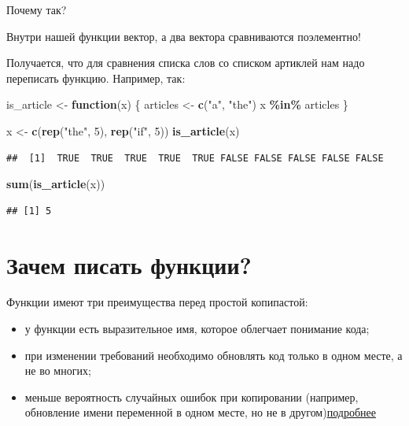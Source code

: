 \documentclass[
]{book}
\newenvironment{Shaded}{\begin{snugshade}}{\end{snugshade}}
\newcommand{\ControlFlowTok}[1]{\textcolor[rgb]{0.13,0.29,0.53}{\textbf{#1}}}
\newcommand{\DecValTok}[1]{\textcolor[rgb]{0.00,0.00,0.81}{#1}}
\newcommand{\FunctionTok}[1]{\textcolor[rgb]{0.13,0.29,0.53}{\textbf{#1}}}
\newcommand{\NormalTok}[1]{#1}
\newcommand{\OtherTok}[1]{\textcolor[rgb]{0.56,0.35,0.01}{#1}}
\newcommand{\SpecialCharTok}[1]{\textcolor[rgb]{0.81,0.36,0.00}{\textbf{#1}}}
\newcommand{\StringTok}[1]{\textcolor[rgb]{0.31,0.60,0.02}{#1}}
\providecommand{\tightlist}{%
  \setlength{\itemsep}{0pt}\setlength{\parskip}{0pt}}
\theoremstyle{definition}
\theoremstyle{definition}
\theoremstyle{definition}
\theoremstyle{definition}
\theoremstyle{remark}
\begin{document}
Почему так?

Внутри нашей функции вектор, а два вектора сравниваются поэлементно!

Получается, что для сравнения списка слов со списком артиклей нам надо переписать функцию. Например, так:

\begin{Shaded}
\begin{Highlighting}[]
\NormalTok{is\_article }\OtherTok{\textless{}{-}} \ControlFlowTok{function}\NormalTok{(x) \{ }
\NormalTok{  articles }\OtherTok{\textless{}{-}} \FunctionTok{c}\NormalTok{(}\StringTok{"a"}\NormalTok{, }\StringTok{"the"}\NormalTok{)}
\NormalTok{  x }\SpecialCharTok{\%in\%}\NormalTok{ articles}
\NormalTok{\}}

\NormalTok{x }\OtherTok{\textless{}{-}} \FunctionTok{c}\NormalTok{(}\FunctionTok{rep}\NormalTok{(}\StringTok{"the"}\NormalTok{, }\DecValTok{5}\NormalTok{), }\FunctionTok{rep}\NormalTok{(}\StringTok{"if"}\NormalTok{, }\DecValTok{5}\NormalTok{))}
\FunctionTok{is\_article}\NormalTok{(x)}
\end{Highlighting}
\end{Shaded}

\begin{verbatim}
##  [1]  TRUE  TRUE  TRUE  TRUE  TRUE FALSE FALSE FALSE FALSE FALSE
\end{verbatim}

\begin{Shaded}
\begin{Highlighting}[]
\FunctionTok{sum}\NormalTok{(}\FunctionTok{is\_article}\NormalTok{(x)) }
\end{Highlighting}
\end{Shaded}

\begin{verbatim}
## [1] 5
\end{verbatim}

\hypertarget{ux437ux430ux447ux435ux43c-ux43fux438ux441ux430ux442ux44c-ux444ux443ux43dux43aux446ux438ux438}{%
\section{Зачем писать функции?}\label{ux437ux430ux447ux435ux43c-ux43fux438ux441ux430ux442ux44c-ux444ux443ux43dux43aux446ux438ux438}}

Функции имеют три преимущества перед простой копипастой:

\begin{itemize}
\tightlist
\item
  у функции есть выразительное имя, которое облегчает понимание кода;
\item
  при изменении требований необходимо обновлять код только в одном месте, а не во многих;
\item
  меньше вероятность случайных ошибок при копировании (например, обновление имени переменной в одном месте, но не в другом)\href{https://r4ds.had.co.nz/functions.html}{подробнее}
\end{itemize}
\end{document}
